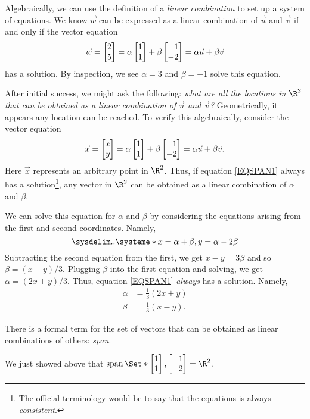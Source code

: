 Algebraically, we can use the definition of a \emph{linear combination} to set up a system of equations.
We know $\vec w$ can be expressed as a linear combination of $\vec u$ and $\vec v$ if and only if 
the vector equation
\[
	\vec w = \mat{2\\5}=\alpha\mat{1\\1}+\beta\mat{1\\-2}=\alpha \vec u+\beta \vec v
\]
has a solution. By inspection, we see $\alpha=3$ and $\beta=-1$ solve this equation.

After initial success, we might ask the following:
\emph{what are all the locations in $\R^2$ that can be obtained
as a linear combination of $\vec u$ and $\vec v$?} Geometrically, it appears
any location can be reached. To verify this algebraically, consider the vector equation
\begin{equation}
	\label{EQSPAN1}
	\vec x=\mat{x\\y} = \alpha\mat{1\\1}+\beta\mat{1\\-2} = \alpha\vec u+\beta\vec v.
\end{equation}
Here $\vec x$ represents an arbitrary point in $\R^2$. Thus, if equation \eqref{EQSPAN1} always
has a solution\footnote{ The official terminology would be to say that
the equations is always \emph{consistent}.}, any vector in $\R^2$ can be obtained as a linear combination of $\alpha$ and $\beta$.

We can solve this equation for $\alpha$ and $\beta$ by considering the equations arising from the
first and second coordinates. Namely,
	\[
		\sysdelim..\systeme*{x=\alpha+\beta, y=\alpha-2\beta}
	\]
Subtracting the second equation from the first, we get $x-y=3\beta$ and so $\beta=(x-y)/3$. Plugging 
$\beta$ into the first equation and solving, we get $\alpha=(2x+y)/3$. Thus, equation \eqref{EQSPAN1}
\emph{always} has a solution. Namely,
\begin{align*}
	\alpha &= \tfrac{1}{3}(2x+y)\\
	\beta &= \tfrac{1}{3}(x-y).
\end{align*}

There is a formal term for the set of vectors that can be obtained as linear combinations
of others: \emph{span}.


We just showed above that $\Span\Set*{\mat{1\\1},\mat{-1\\2}}=\R^2$.

